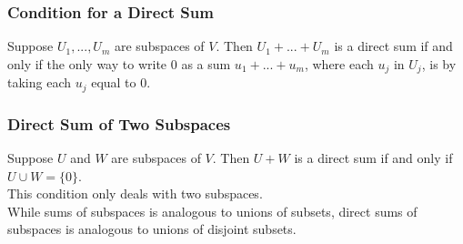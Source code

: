 \documentclass{article}
\begin{document}
	\subsubsection{Condition for a Direct Sum}
	Suppose $U_1,...,U_m$ are subspaces of $V$. Then $U_1+...+U_m$ is a direct sum if and only if the only way to write $0$ as a sum $u_1+...+u_m$, where each $u_j$ in $U_j$, is by taking each $u_j$ equal to $0$.
	\subsubsection{Direct Sum of Two Subspaces}
	Suppose $U$ and $W$ are subspaces of $V$. Then $U+W$ is a direct sum if and only if $U\cup W = \{0\}$.\\
	This condition only deals with two subspaces.\\
	While sums of subspaces is analogous to unions of subsets, direct sums of subspaces is analogous to unions of disjoint subsets.
\end{document}

